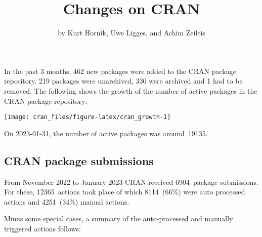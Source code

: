 \title{Changes on CRAN}
\author{by Kurt Hornik, Uwe Ligges, and Achim Zeileis}

\maketitle


In the past 3 months, 462 new packages were
added to the CRAN package repository. 219
packages were unarchived, 330 were archived and
1 had to be removed. The following shows the
growth of the number of active packages in the CRAN package repository:

\begin{center}\texttt{[image: cran\_files/figure-latex/cran\_growth-1]} \end{center}

\noindent On 2023-01-31, the number of active packages was around~19135.

\hypertarget{cran-package-submissions}{%
\subsection{CRAN package submissions}\label{cran-package-submissions}}

From November 2022 to January 2023
CRAN received 6904~package submissions.
For these, 12365~actions took place of which
8114~(66\%) were auto processed actions and
4251~(34\%) manual actions.

Minus some special cases, a summary of the auto-processed and manually
triggered actions follows:

